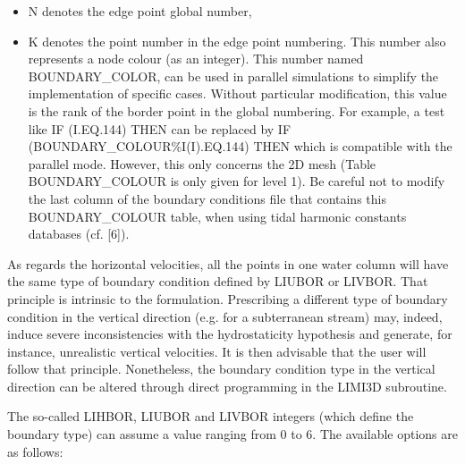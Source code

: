 \begin{itemize}
\item N denotes the edge point global number,

\item K denotes the point number in the edge point numbering. This number also
represents a node colour (as an integer). This number named BOUNDARY\_COLOR,
can be used in parallel simulations to simplify the implementation of specific
cases. Without particular modification, this value is the rank of the border
point in the global numbering. For example, a test like IF (I.EQ.144) THEN can
be replaced by IF (BOUNDARY\_COLOUR\%I(I).EQ.144) THEN which is compatible with
the parallel mode. However, this only concerns the 2D mesh (Table
BOUNDARY\_COLOUR is only given for level 1). Be careful not to modify the last
column of the boundary conditions file that contains this BOUNDARY\_COLOUR
table, when using tidal harmonic constants databases (cf. [6]).
\end{itemize}

As regards the horizontal velocities, all the points in one water column will
have the same type of boundary condition defined by LIUBOR or LIVBOR.
That principle is intrinsic to the  formulation. Prescribing a
different type of boundary condition in the vertical direction (e.g. for a
subterranean stream) may, indeed, induce severe inconsistencies with the
hydrostaticity hypothesis and generate, for instance, unrealistic vertical
velocities. It is then advisable that the user will follow that principle.
Nonetheless, the boundary condition type in the vertical direction can be
altered through direct programming in the LIMI3D subroutine.

The so-called LIHBOR, LIUBOR and LIVBOR integers (which define the
boundary type) can assume a value ranging from 0 to 6. The available options
are as follows:

